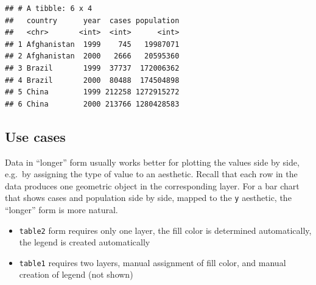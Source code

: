 \documentclass[]{book}
\newenvironment{Shaded}{}{}
\newcommand{\DataTypeTok}[1]{#1}
\newcommand{\KeywordTok}[1]{\textcolor[rgb]{0.00,0.00,1.00}{#1}}
\newcommand{\NormalTok}[1]{#1}
\newcommand{\OperatorTok}[1]{#1}
\newcommand{\StringTok}[1]{\textcolor[rgb]{0.00,0.50,0.50}{#1}}
\providecommand{\tightlist}{%
  \setlength{\itemsep}{0pt}\setlength{\parskip}{0pt}}
\begin{document}
\begin{Shaded}
\end{Shaded}

\begin{verbatim}
## # A tibble: 6 x 4
##   country      year  cases population
##   <chr>       <int>  <int>      <int>
## 1 Afghanistan  1999    745   19987071
## 2 Afghanistan  2000   2666   20595360
## 3 Brazil       1999  37737  172006362
## 4 Brazil       2000  80488  174504898
## 5 China        1999 212258 1272915272
## 6 China        2000 213766 1280428583
\end{verbatim}

\hypertarget{use-cases}{%
\subsection{Use cases}\label{use-cases}}

Data in ``longer'' form usually works better for plotting the values side by side, e.g.~by assigning the type of value to an aesthetic.
Recall that each row in the data produces one geometric object in the corresponding layer.
For a bar chart that shows cases and population side by side, mapped to the \texttt{y} aesthetic, the ``longer'' form is more natural.

\begin{itemize}
\tightlist
\item
  \texttt{table2} form requires only one layer, the fill color is determined automatically, the legend is created automatically
\item
  \texttt{table1} requires two layers, manual assignment of fill color, and manual creation of legend (not shown)
\end{itemize}

\begin{Shaded}
\end{Shaded}
\end{document}
